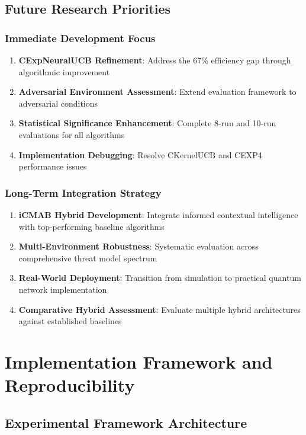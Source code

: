 \documentclass[12pt,a4paper]{article}
\begin{document}
\subsection{Future Research Priorities}

\subsubsection{Immediate Development Focus}
\begin{enumerate}
\item \textbf{CExpNeuralUCB Refinement}: Address the 67\% efficiency gap through algorithmic improvement
\item \textbf{Adversarial Environment Assessment}: Extend evaluation framework to adversarial conditions
\item \textbf{Statistical Significance Enhancement}: Complete 8-run and 10-run evaluations for all algorithms
\item \textbf{Implementation Debugging}: Resolve CKernelUCB and CEXP4 performance issues
\end{enumerate}

\subsubsection{Long-Term Integration Strategy}
\begin{enumerate}
\item \textbf{iCMAB Hybrid Development}: Integrate informed contextual intelligence with top-performing baseline algorithms
\item \textbf{Multi-Environment Robustness}: Systematic evaluation across comprehensive threat model spectrum
\item \textbf{Real-World Deployment}: Transition from simulation to practical quantum network implementation
\item \textbf{Comparative Hybrid Assessment}: Evaluate multiple hybrid architectures against established baselines
\end{enumerate}

\section{Implementation Framework and Reproducibility}

\subsection{Experimental Framework Architecture}
\end{document}
